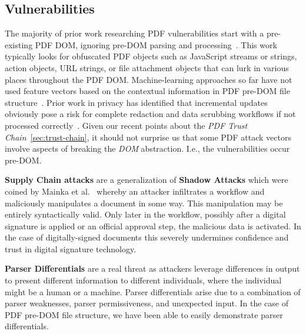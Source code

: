 \subsection{Vulnerabilities}
\label{sec:vulnerabilities}


The majority of prior work researching PDF vulnerabilities start with a pre-existing PDF DOM,
ignoring pre-DOM parsing and processing~\cite{smutzMaliciousPDFDetection2012,liuDetectingMaliciousJavascript2014,iwamotoStudyMaliciousPDF2016}. 
This work typically looks for obfuscated PDF objects such as
JavaScript streams or strings, action objects, URL strings, or file attachment objects that 
can lurk in various places throughout the PDF DOM. Machine-learning approaches so far have not  
used feature vectors based on the contextual information in PDF pre-DOM file structure~\cite{andrewmangleAnalysisMachineLearning2021,manharmohammedHAPSSAHolisticApproach2021}. 
Prior work in privacy has identified that incremental updates obviously pose a risk for complete
redaction and data scrubbing workflows if not processed correctly~\cite{adhataraoHowArePDF2021,y.fengSystematicMethodPDF2018}.
Given our recent points about the \emph{PDF Trust Chain}~\cref{sec:trust-chain}, it should not 
surprise us that some PDF attack vectors involve aspects of breaking the \emph{DOM} abstraction.
I.e., the vulnerabilities occur pre-DOM.

{\bf{Supply Chain attacks}} are a generalization of {\bf{Shadow Attacks}} which were coined by Mainka 
et al.~\cite{mainkaShadowAttacksHiding2021} whereby an attacker infiltrates a workflow and 
maliciously manipulates a document in some way. This manipulation may be entirely syntactically valid.
Only later in the workflow, possibly after a 
digital signature is applied or an official approval step, the malicious data is 
activated. In the case of digitally-signed documents this severely undermines confidence and trust
in digital signature technology.


{\bf{Parser Differentials}} are a real threat as attackers leverage differences in output
to present different information to different individuals, where the individual might be a human
or a machine. Parser differentials arise due to a combination of parser weaknesses, 
parser permissiveness, and unexpected input. In the case of PDF pre-DOM file structure, we have been
able to easily demonstrate parser differentials.

